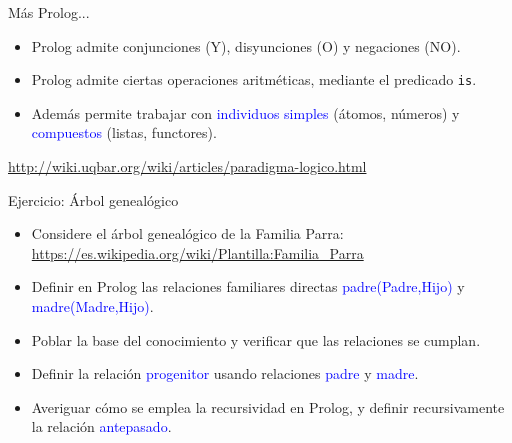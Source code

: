 \documentclass[handout]{beamer} %
\newcommand{\blue}[1]{\textcolor{blue}{#1}}
\newcommand{\green}[1]{{\color{green!70!black}{#1}}}
\begin{document}
\begin{frame}{Más Prolog...}
    \begin{itemize}
        \item Prolog admite conjunciones (Y), disyunciones (O) y negaciones (NO).
        \item Prolog admite ciertas operaciones aritméticas, mediante el predicado \texttt{is}.
        \item Además permite trabajar con \blue{individuos simples} (átomos, números) y \blue{compuestos} (listas, functores).
    \end{itemize}
    \begin{flushright}
        {\small \blue{\url{http://wiki.uqbar.org/wiki/articles/paradigma-logico.html}}}
    \end{flushright}
\end{frame}

\begin{frame}{Ejercicio: Árbol genealógico}
    \begin{itemize}
        \item Considere el árbol genealógico de la Familia Parra:\\ {\small \blue{\url{https://es.wikipedia.org/wiki/Plantilla:Familia_Parra}}}
        \item Definir en Prolog las relaciones familiares directas \blue{padre(Padre,Hijo)} y \blue{madre(Madre,Hijo)}.
        \item Poblar la base del conocimiento y verificar que las relaciones se cumplan.
        \item Definir la relación \blue{progenitor} usando relaciones \blue{padre} y \blue{madre}.
        \item Averiguar cómo se emplea la recursividad en Prolog, y definir recursivamente la relación \blue{antepasado}.
    \end{itemize}
    \begin{flushright}
        \green{[+1 bonus]}
    \end{flushright}
\end{frame}
\end{document}
